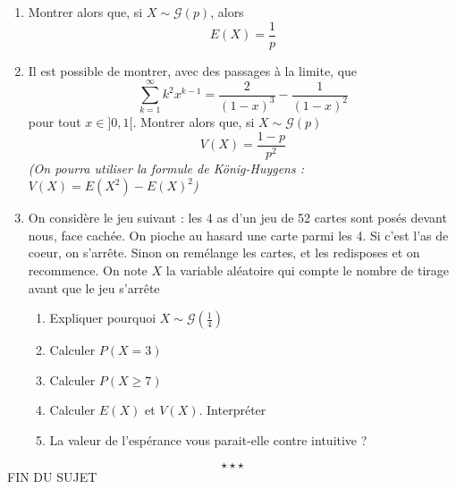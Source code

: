 \begin{enumerate}
\item Montrer alors que, si $X\sim \mathcal{G}(p)$, alors $$\boxed{E(X) = \frac{1}{p}}$$
\item Il est possible de montrer, avec des passages à la limite, que 
$$\sum_{k=1}^\infty k^2x^{k-1} = \frac{2}{(1-x)^3}-\frac{1}{(1-x)^2}$$
pour tout $x\in]0,1[$. Montrer alors que, si $X\sim \mathcal{G}(p)$
$$\boxed{V(X) = \frac{1-p}{p^2}}$$
\emph{(On pourra utiliser la formule de König-Huygens : $V(X) = E(X^2) - E(X)^2$)}
\item On considère le jeu suivant : les 4 as d'un jeu de 52 cartes sont posés devant nous, face cachée. On pioche au hasard une carte parmi les 4. Si c'est l'as de coeur, on s'arrête. Sinon on remélange les cartes, et les redisposes et on recommence. On note $X$ la variable aléatoire qui compte le nombre de tirage avant que le jeu s'arrête\begin{enumerate} \item Expliquer pourquoi $X\sim \mathcal{G}(\frac{1}{4})$ \item Calculer $P(X = 3)$ \item Calculer $P(X \geq 7)$ \item Calculer $E(X)$ et $V(X)$. Interpréter \item La valeur de l'espérance vous parait-elle contre intuitive ?\end{enumerate}
\end{enumerate}
$$\star \star \star$$
\center
FIN DU SUJET
